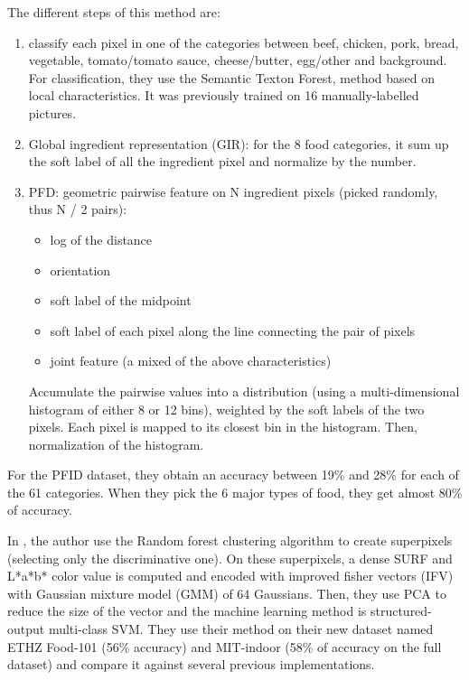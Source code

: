 The different steps of this method are:
\begin{enumerate}
    \item classify each pixel in one of the categories between beef, chicken, pork, bread, vegetable,  tomato/tomato sauce, cheese/butter, egg/other and background. For classification, they use the Semantic Texton Forest, method based on local characteristics. It was previously trained on 16 manually-labelled pictures.
    
    \item Global ingredient representation (GIR): for the 8 food categories, it sum up the soft label of all the ingredient pixel and normalize by the number.
    
    \item PFD: geometric pairwise feature on N ingredient pixels (picked randomly, thus N / 2 pairs):
    \begin{itemize}
        \item log of the distance
        \item orientation
        \item soft label of the midpoint
        \item soft label of each pixel along the line connecting the pair of pixels
        \item joint feature (a mixed of the above characteristics)
    \end{itemize}
    Accumulate the pairwise values into a distribution (using a multi-dimensional histogram of either 8 or 12 bins), weighted by the soft labels of the two pixels. Each pixel is mapped to its closest bin in the histogram.
    Then, normalization of the histogram.
\end{enumerate}

For the PFID dataset, they obtain an accuracy between 19\% and 28\% for each of the 61 categories.
When they pick the 6 major types of food, they get almost 80\% of accuracy.


In \cite{Bossard2014}, the author use the Random forest clustering algorithm to create superpixels (selecting only the discriminative one). On these superpixels, a dense SURF and L*a*b* color value is computed and encoded with improved fisher vectors (IFV) with Gaussian mixture model (GMM) of 64 Gaussians.
Then, they use PCA to reduce the size of the vector and the machine learning method is structured-output multi-class SVM. They use their method on their new dataset named ETHZ Food-101 (56\% accuracy) and MIT-indoor (58\% of accuracy on the full dataset) and compare it against several previous implementations.

